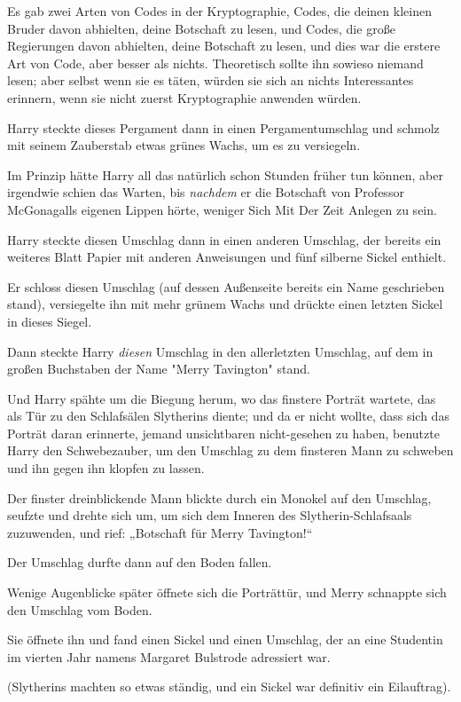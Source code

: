 {Es gab zwei Arten von Codes in der Kryptographie, Codes, die deinen kleinen Bruder davon abhielten, deine Botschaft zu lesen, und Codes, die große Regierungen davon abhielten, deine Botschaft zu lesen, und dies war die erstere Art von Code, aber besser als nichts. Theoretisch sollte ihn sowieso niemand lesen; aber selbst wenn sie es täten, würden sie sich an nichts Interessantes erinnern, wenn sie nicht zuerst Kryptographie anwenden würden.

Harry steckte dieses Pergament dann in einen Pergamentumschlag und schmolz mit seinem Zauberstab etwas grünes Wachs, um es zu versiegeln.

Im Prinzip hätte Harry all das natürlich schon Stunden früher tun können, aber irgendwie schien das Warten, bis \emph{nachdem} er die Botschaft von Professor McGonagalls eigenen Lippen hörte, weniger Sich Mit Der Zeit Anlegen zu sein.

Harry steckte diesen Umschlag dann in einen anderen Umschlag, der bereits ein weiteres Blatt Papier mit anderen Anweisungen und fünf silberne Sickel enthielt.

Er schloss diesen Umschlag (auf dessen Außenseite bereits ein Name geschrieben stand), versiegelte ihn mit mehr grünem Wachs und drückte einen letzten Sickel in dieses Siegel.

Dann steckte Harry \emph{diesen} Umschlag in den allerletzten Umschlag, auf dem in großen Buchstaben der Name "Merry Tavington" stand.

Und Harry spähte um die Biegung herum, wo das finstere Porträt wartete, das als Tür zu den Schlafsälen Slytherins diente; und da er nicht wollte, dass sich das Porträt daran erinnerte, jemand unsichtbaren nicht-gesehen zu haben, benutzte Harry den Schwebezauber, um den Umschlag zu dem finsteren Mann zu schweben und ihn gegen ihn klopfen zu lassen.

Der finster dreinblickende Mann blickte durch ein Monokel auf den Umschlag, seufzte und drehte sich um, um sich dem Inneren des Slytherin-Schlafsaals zuzuwenden, und rief: „Botschaft für Merry Tavington!“

Der Umschlag durfte dann auf den Boden fallen.

Wenige Augenblicke später öffnete sich die Porträttür, und Merry schnappte sich den Umschlag vom Boden.

Sie öffnete ihn und fand einen Sickel und einen Umschlag, der an eine Studentin im vierten Jahr namens Margaret Bulstrode adressiert war.

(Slytherins machten so etwas ständig, und ein Sickel war definitiv ein Eilauftrag).

}
